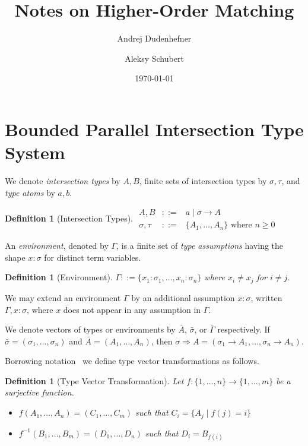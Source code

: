 \documentclass[10pt,a4paper]{article}
\title{Notes on Higher-Order Matching}
\author{Andrej Dudenhefner \and Aleksy Schubert}
\date{\today}
\theoremstyle{plain}%
\newtheorem{definition}[theorem]{Definition}
\begin{document}
\maketitle

\section{Bounded Parallel Intersection Type System}

We denote \emph{intersection types} by $A, B$, finite sets of intersection types by $\sigma, \tau$, and \emph{type atoms} by $a, b$.

\begin{definition}[Intersection Types]
\label{def:itypes}
$\begin{array}{rcl}
A, B &::=& a \mid \sigma \to A\\
\sigma, \tau &::=& \{A_1, \ldots, A_n\} \text{ where } n \geq 0
\end{array}$
\end{definition}

An \emph{environment}, denoted by $\Gamma$, is a finite set of \emph{type assumptions} having the shape $x : \sigma$ for distinct term variables.
\begin{definition}[Environment]
$\Gamma ::=\{x_1 : \sigma_1, \ldots, x_n : \sigma_n\}$ where $x_i \neq x_j$ for $i \neq j$.
\end{definition}
We may extend an environment $\Gamma$ by an additional assumption $x : \sigma$, written $\Gamma, x : \sigma$, where $x$ does not appear in any assumption in $\Gamma$.

We denote vectors of types or environments by $\bar{A}$, $\bar{\sigma}$, or $\bar{\Gamma}$ respectively.
If $\bar{\sigma} = (\sigma_1, \ldots, \sigma_n)$ and $\bar{A} = (A_1, \ldots, A_n)$, then $\sigma \Rightarrow A = (\sigma_1 \to A_1, \ldots, \sigma_n \to A_n)$.

Borrowing notation~\cite{DudenhefnerU21} we define type vector transformations as follows.

\begin{definition}[Type Vector Transformation]
Let $f : \{1, \ldots, n\} \to \{1, \ldots, m\}$ be a surjective function.
\begin{itemize}
\item $f(A_1, \ldots, A_n) = (C_1, \ldots, C_m)$ such that $C_i = \{ A_j \mid f(j) = i \}$
\item $f^{-1}(B_1, \ldots, B_m) = (D_1, \ldots, D_n)$ such that $D_i = B_{f(i)}$
\end{itemize}
\end{definition}
\end{document}

